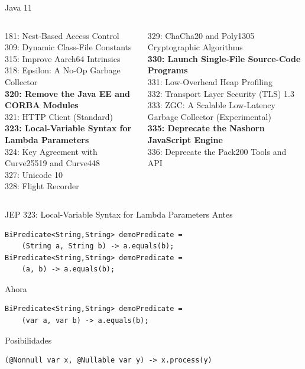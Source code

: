 \documentclass[aspectratio=169]{beamer}
\begin{document}
\begin{frame}[fragile]{Java 11}\scriptsize
\begin{columns}[T] %
    
    \begin{column}[T]{6cm} %
        181: Nest-Based Access Control\\
        309: Dynamic Class-File Constants\\
        315: Improve Aarch64 Intrinsics\\
        318: Epsilon: A No-Op Garbage Collector\\
        \textbf{320: Remove the Java EE and CORBA Modules}\\
        321: HTTP Client (Standard)\\
        \textbf{323: Local-Variable Syntax for Lambda Parameters}\\
        324: Key Agreement with Curve25519 and Curve448\\
        327: Unicode 10\\
        328: Flight Recorder\\
    \end{column}
    \begin{column}[T]{6cm} %
        329: ChaCha20 and Poly1305 Cryptographic Algorithms\\
        \textbf{330: Launch Single-File Source-Code Programs}\\
        331: Low-Overhead Heap Profiling\\
        332: Transport Layer Security (TLS) 1.3\\
        333: ZGC: A Scalable Low-Latency Garbage Collector
        (Experimental)\\
        \textbf{335: Deprecate the Nashorn JavaScript Engine}\\
        336: Deprecate the Pack200 Tools and API\\
    \end{column}
\end{columns}
\end{frame}
    

\begin{frame}[fragile]{JEP 323: Local-Variable Syntax for Lambda Parameters}
Antes
\begin{lstlisting}
BiPredicate<String,String> demoPredicate =
    (String a, String b) -> a.equals(b);
BiPredicate<String,String> demoPredicate =
    (a, b) -> a.equals(b);
\end{lstlisting}

Ahora
\begin{lstlisting}
BiPredicate<String,String> demoPredicate =
    (var a, var b) -> a.equals(b);
\end{lstlisting}	

Posibilidades
\begin{lstlisting}
(@Nonnull var x, @Nullable var y) -> x.process(y)
\end{lstlisting}	
\end{frame}
\end{document}
